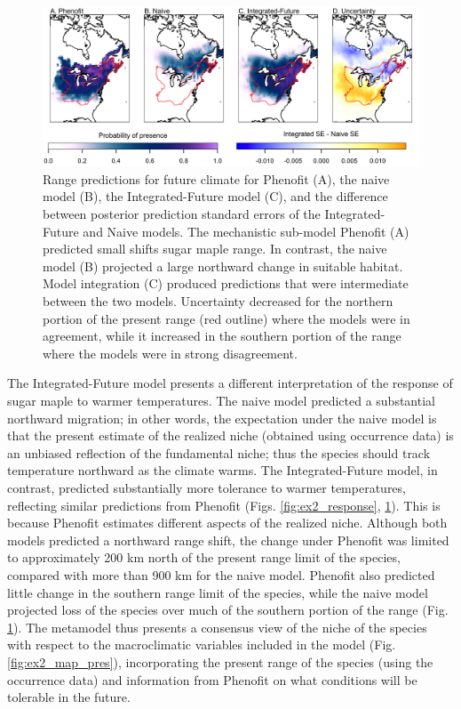 \documentclass[11pt]{article}
\newcommand{\rev}[1]{{\color{RoyalBlue}#1}}
\begin{document}
\begin{figure}[t]
\includegraphics[width=6.5in]{figs/ex2_fut_map.png}
\caption{Range predictions for future climate for Phenofit (A), the naive model (B), the Integrated-Future model (C), and the difference between posterior prediction standard errors of the Integrated-Future and Naive models.
The mechanistic sub-model Phenofit (A) predicted small shifts sugar maple range.
In contrast, the naive model (B) projected a large northward change in suitable habitat.
Model integration (C) produced predictions that were intermediate between the two models.
Uncertainty decreased for the northern portion of the present range (red outline) where the models were in agreement, while it increased in the southern portion of the range where the models were in strong disagreement.}
\label{fig:ex2_map_fut}
\end{figure}

The Integrated-Future model presents a different interpretation of the response of sugar maple to warmer temperatures. 
The naive model predicted a substantial northward migration; in other words, the expectation under the naive model \rev{is that the present estimate of the realized niche (obtained using occurrence data) is an unbiased reflection of the fundamental niche; thus the species should track temperature northward as the climate warms}.
The Integrated-Future model, in contrast, predicted substantially more tolerance to warmer temperatures, reflecting similar predictions from Phenofit (Figs. \ref{fig:ex2_response}, \ref{fig:ex2_map_fut}).
\rev{This is because Phenofit estimates different aspects of the realized niche.}
Although both models predicted a northward range shift, the change under Phenofit was limited to approximately 200 km north of the present range limit of the species, compared with more than 900 km for the naive model.
Phenofit also predicted little change in the southern range limit of the species, while the naive model projected loss of the species over much of the southern portion of the range (Fig. \ref{fig:ex2_map_fut}).
\rev{The metamodel thus presents a consensus view of the niche of the species with respect to the macroclimatic variables included in the model (Fig. \ref{fig:ex2_map_pres}), incorporating the present range of the species (using the occurrence data) and information from Phenofit on what conditions will be tolerable in the future.}
\end{document}
